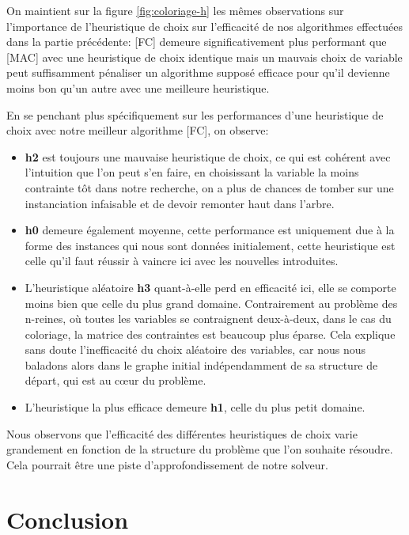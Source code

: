 \documentclass[14pt]{article}
\begin{document}
On maintient sur la figure \ref{fig:coloriage-h} les mêmes observations sur l'importance de l'heuristique de choix sur l'efficacité de nos algorithmes effectuées dans la partie précédente: [FC] demeure significativement plus performant que [MAC] avec une heuristique de choix identique mais un mauvais choix de variable peut suffisamment pénaliser un algorithme supposé efficace pour qu'il devienne moins bon qu'un autre avec une meilleure heuristique.

En se penchant plus spécifiquement sur les performances d'une heuristique de choix avec notre meilleur algorithme [FC], on observe:
\begin{itemize}
	\item \textbf{h2} est toujours une mauvaise heuristique de choix, ce qui est cohérent avec l'intuition que l'on peut s'en faire, en choisissant la variable la moins contrainte tôt dans notre recherche, on a plus de chances de tomber sur une instanciation infaisable et de devoir remonter haut dans l'arbre.
	\item \textbf{h0} demeure également moyenne, cette performance est uniquement due à la forme des instances qui nous sont données initialement, cette heuristique est celle qu'il faut réussir à vaincre ici avec les nouvelles introduites.
	\item L'heuristique aléatoire \textbf{h3} quant-à-elle perd en efficacité ici, elle se comporte moins bien que celle du plus grand domaine. Contrairement au problème des n-reines, où toutes les variables se contraignent deux-à-deux, dans le cas du coloriage, la matrice des contraintes est beaucoup plus éparse. Cela explique sans doute l'inefficacité du choix aléatoire des variables, car nous nous baladons alors dans le graphe initial indépendamment de sa structure de départ, qui est au cœur du problème.
	\item L'heuristique la plus efficace demeure \textbf{h1}, celle du plus petit domaine.
\end{itemize}

Nous observons que l'efficacité des différentes heuristiques de choix varie grandement en fonction de la structure du problème que l'on souhaite résoudre. Cela pourrait être une piste d'approfondissement de notre solveur.

\clearpage

\section{Conclusion}
\end{document}
